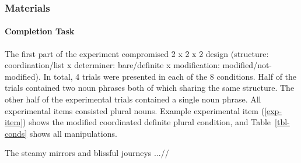 \documentclass[
  10pt,
  letterpaper,
  DIV=11,
  numbers=noendperiod]{scrartcl}
\let\oldparagraph\paragraph
\renewcommand{\paragraph}[1]{\oldparagraph{#1}\mbox{}}
\begin{document}
\hypertarget{materials}{%
\subsubsection{Materials}\label{materials}}

\hypertarget{completion-task}{%
\paragraph{Completion Task}\label{completion-task}}

The first part of the experiment compromised 2 x 2 x 2 design
(structure: coordination/list x determiner: bare/definite x
modification: modified/not-modified). In total, 4 trials were presented
in each of the 8 conditions. Half of the trials contained two noun
phrases both of which sharing the same structure. The other half of the
experimental trials contained a single noun phrase. All experimental
items consisted plural nouns. Example experimental item (\ref{exp-item})
shows the modified coordinated definite plural condition, and
Table~\ref{tbl-conds} shows all manipulations.


\ex\label{exp-item} \begingl \gla The steamy mirrors and blissful
journeys ...// \endgl \xe
\end{document}
